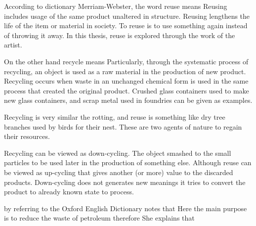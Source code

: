 According to dictionary Merriam-Webster, the word reuse means  Reusing includes usage of the same product unaltered in structure. Reusing lengthens the life of the item or material in society. To reuse is to use something again instead of throwing it away. In this thesis, reuse is explored through the work of the artist.

On the other hand recycle means  Particularly, through the systematic process of recycling, an object is used as a raw material in the production of new product. Recycling occurs when waste in an unchanged chemical form is used in the same process that created the original product. Crushed glass containers used to make new glass containers, and scrap metal used in foundries can be given as examples.

Recycling is very similar the rotting, and reuse is something like dry tree branches used by birds for their nest. These are two agents of nature to regain their resources.

Recycling can be viewed as down-cycling. The object smashed to the small particles to be used later in the production of something else. Although reuse can be viewed as up-cycling that gives another (or more) value to the discarded products. Down-cycling does not generates new meanings it tries to convert the product to already known state to process. 

\citet[72]{strasser1999waste} by referring to the Oxford English Dictionary notes that  Here the main purpose is to reduce the waste of petroleum therefore  She explains that 

